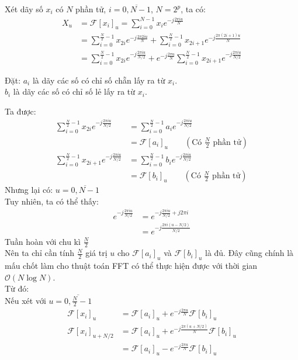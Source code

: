 \documentclass[../report.tex]{subfiles}
\begin{document}
\noindent Xét dãy số $x_i$ có $N$ phần tử, 
$i = \overline{0, N - 1}$,
$N = 2^p$, ta có: 
\begin{align*}
    X_u &= \mathcal{F}[x_i]_u = \sum_{i = 0}^{N - 1} x_i 
    e^{-j\frac{2\pi i u}{N}} \\
    &= \sum_{i = 0}^{\frac{N}{2} - 1} 
    x_{2i} e^{-j\frac{2\pi 2 i u}{N}}
    + \sum_{i = 0}^{\frac{N}{2} - 1} x_{2i + 1} 
    e^{-j\frac{2\pi (2i + 1) u}{N}} \\
    &= \sum_{i = 0}^{\frac{N}{2} - 1} 
    x_{2i} e^{-j\frac{2\pi i u}{N/2}}
    + e^{-j\frac{2\pi u}{N}} 
    \sum_{i = 0}^{\frac{N}{2} - 1} x_{2i+ 1} 
    e^{-j\frac{2\pi i u}{N / 2}}
\end{align*}

\noindent Đặt: $a_i$ là dãy các số có chỉ số chẵn lấy ra từ $x_i$. \\
\hspace*{22pt} $b_i$ là dãy các số có chỉ số lẻ lấy ra từ $x_i$.

\noindent Ta được: 
\begin{align*}
    \sum_{i = 0}^{\frac{N}{2} - 1} x_{2i} e^{-j\frac{2\pi i u}{N/2}}
    &= \sum_{i = 0}^{\frac{N}{2} - 1} a_i e^{-j\frac{2\pi i u}{N/2}} \\
    &= \mathcal{F}[a_i]_u 
    \quad\quad\left(\textrm{Có }\frac{N}{2}\textrm{ phần tử}\right) \\
    \sum_{i = 0}^{\frac{N}{2} - 1} x_{2i + 1} e^{-j\frac{2\pi i u}{N/2}}
    &= \sum_{i = 0}^{\frac{N}{2} - 1} b_i e^{-j\frac{2\pi i u}{N/2}} \\
    &= \mathcal{F}[b_i]_u
    \quad\quad\left(\textrm{Có }\frac{N}{2}\textrm{ phần tử}\right)
\end{align*}
Nhưng lại có: $u = \overline{0, N - 1}$ \\[5mm]

\noindent Tuy nhiên, ta có thể thấy:
\begin{align*}
    e^{-j\frac{2\pi i u}{N/2}} 
    &= e^{-j\frac{2\pi i u}{N/2} + j 2\pi i}  \\
    &= e^{-j\frac{2\pi i (u - N/2)}{N/2}}
\end{align*}
Tuần hoàn với chu kì $\frac{N}{2}$ \\
Nên ta chỉ cần tính $\frac{N}{2}$ giá trị $u$ cho 
$\mathcal{F}[a_i]_u$ và $\mathcal{F}[b_i]_u$ là đủ. Đây cũng
chính là mấu chốt làm cho thuật toán FFT có thể thực hiện được với 
thời gian $\mathcal{O}(N \log N)$. \\[5mm]

\noindent Từ đó: \\
Nếu xét với $u = \overline{0, \frac{N}{2} - 1}$
\begin{align*}
    \mathcal{F}[x_i]_u &= \mathcal{F}[a_i]_u 
    + e^{-j\frac{2\pi u}{N}} \mathcal{F}[b_i]_u \\
    \mathcal{F}[x_i]_{u + N/2} &= \mathcal{F}[a_i]_u 
    + e^{-j\frac{2\pi (u + N/2)}{N}} \mathcal{F}[b_i]_u \\
    &= \mathcal{F}[a_i]_u 
    - e^{-j\frac{2\pi u}{N}} \mathcal{F}[b_i]_u
\end{align*}\\[5mm]
\end{document}
